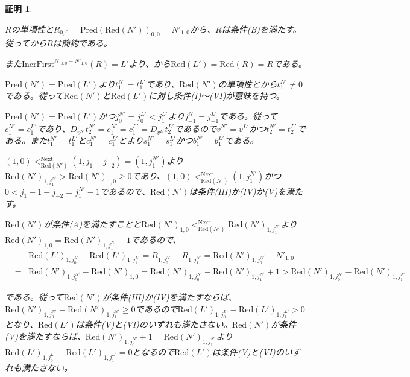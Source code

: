 \documentclass[dvipdfmx,uplatex]{jsarticle}
\theoremstyle{customnonumberbreakfortheorem}
\theoremstyle{customnonumberbreakforproof}
\newtheorem{hideableproof}{証明}
\begin{document}
\begin{hideableproof}
\begin{indented}
		\item \(R\)の単項性と\(R_{0,0} = \textrm{Pred}(\textrm{Red}(N'))_{0,0} = N'_{1,0}\)から、\(R\)は条件(B)を満たす。従ってから\(R\)は簡約である。
		\item また\(\textrm{IncrFirst}^{N'_{0,0}-N'_{1,0}}(R) = L'\)より、から\(\textrm{Red}(L') = \textrm{Red}(R) = R\)である。
		\item
		\item \(\textrm{Pred}(N') = \textrm{Pred}(L')\)より\(t_1^{N'} = t_1^{L'}\)であり、\(\textrm{Red}(N')\)の単項性とから\(t_1^{N'} \neq 0\)である。従って\(\textrm{Red}(N')\)と\(\textrm{Red}(L')\)に対し条件(I)～(VI)が意味を持つ。
		\item \(\textrm{Pred}(N') = \textrm{Pred}(L')\)かつ\(j_0^{N'} = j_0^{L'} < j_1^{L'}\)より\(j_{-1}^{N'} = j_{-1}^{L'}\)である。従って\(c_1^{N'} = c_1^{L'}\)であり、\(D_{v^{N'}} t_2^{N'} = c_1^{N'} = c_1^{L'} = D_{v^{L'}} t_2^{L'}\)であるので\(v^{N'} = v^{L'}\)かつ\(t_2^{N'} = t_2^{L'}\)である。また\(t_1^{N'} = t_1^{L'}\)と\(c_1^{N'} = c_1^{L'}\)とより\(s_1^{N'} = s_1^{L'}\)かつ\(b_1^{N'} = b_1^{L'}\)である。
		\item \((1,0) <_{\textrm{Red}(N')}^{\textrm{Next}} (1,j_1-j_{-2}) = (1,j_1^{N'})\)より\(\textrm{Red}(N')_{1,j_1^{N'}} > \textrm{Red}(N')_{1,0} \geq 0\)であり、\((1,0) <_{\textrm{Red}(N')}^{\textrm{Next}} (1,j_1^{N'})\)かつ\(0 < j_1-1-j_{-2} = j_1^{N'}-1\)であるので、\(\textrm{Red}(N')\)は条件(III)か(IV)か(V)を満たす。
		\item \(\textrm{Red}(N')\)が条件(A)を満たすことと\(\textrm{Red}(N')_{1,0} <_{\textrm{Red}(N')}^{\textrm{Next}} \textrm{Red}(N')_{1,j_1^{N'}}\)より\(\textrm{Red}(N')_{1,0} = \textrm{Red}(N')_{1,j_1^{N'}}-1\)であるので、
		\begin{eqnarray*}
		& & \textrm{Red}(L')_{1,j_0^{L'}} - \textrm{Red}(L')_{1,j_1^{L'}} = R_{1,j_0^{N'}} - R_{1,j_1^{N'}} = \textrm{Red}(N')_{1,j_0^{N'}} - N'_{1,0} \\
		& = & \textrm{Red}(N')_{1,j_0^{N'}} - \textrm{Red}(N')_{1,0} = \textrm{Red}(N')_{1,j_0^{N'}} - \textrm{Red}(N')_{1,j_1^{N'}} + 1 > \textrm{Red}(N')_{1,j_0^{N'}} - \textrm{Red}(N')_{1,j_1^{N'}}
		\end{eqnarray*}
		\item である。従って\(\textrm{Red}(N')\)が条件(III)か(IV)を満たすならば、\(\textrm{Red}(N')_{1,j_0^{N'}} - \textrm{Red}(N')_{1,j_1^{N'}} \geq 0\)であるので\(\textrm{Red}(L')_{1,j_0^{L'}} - \textrm{Red}(L')_{1,j_1^{L'}} > 0\)となり、\(\textrm{Red}(L')\)は条件(V)と(VI)のいずれも満たさない。\(\textrm{Red}(N')\)が条件(V)を満たすならば、\(\textrm{Red}(N')_{1,j_0^{N'}}+1 = \textrm{Red}(N')_{1,j_1^{N'}}\)より\(\textrm{Red}(L')_{1,j_0^{L'}} - \textrm{Red}(L')_{1,j_1^{L'}} = 0\)となるので\(\textrm{Red}(L')\)は条件(V)と(VI)のいずれも満たさない。

\end{indented}
\end{hideableproof}
\end{document}
